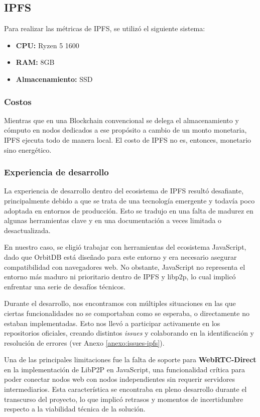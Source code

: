 \subsection{IPFS}

Para realizar las métricas de IPFS, se utilizó el siguiente sistema:
\begin{itemize}
    \item \textbf{CPU:} Ryzen 5 1600
    \item \textbf{RAM:} 8GB
    \item \textbf{Almacenamiento:} SSD
\end{itemize}

\subsubsection{Costos}

Mientras que en una Blockchain convencional se delega el almacenamiento y cómputo en nodos dedicados a ese propósito a cambio de un monto monetaria, IPFS ejecuta todo de manera local. El costo de IPFS no es, entonces, monetario sino energético.

\subsubsection{Experiencia de desarrollo}

La experiencia de desarrollo dentro del ecosistema de IPFS resultó desafiante, principalmente debido a que se trata de una tecnología emergente y todavía poco adoptada en entornos de producción. Esto se tradujo en una falta de madurez en algunas herramientas clave y en una documentación a veces limitada o desactualizada.

En nuestro caso, se eligió trabajar con herramientas del ecosistema JavaScript, dado que OrbitDB está diseñado para este entorno y era necesario asegurar compatibilidad con navegadores web. No obstante, JavaScript no representa el entorno más maduro ni prioritario dentro de IPFS y libp2p, lo cual implicó enfrentar una serie de desafíos técnicos.

Durante el desarrollo, nos encontramos con múltiples situaciones en las que ciertas funcionalidades no se comportaban como se esperaba, o directamente no estaban implementadas. Esto nos llevó a participar activamente en los repositorios oficiales, creando distintos \textit{issues} y colaborando en la identificación y resolución de errores (ver Anexo \ref{anexo:issues-ipfs}).

Una de las principales limitaciones fue la falta de soporte para \textbf{WebRTC-Direct} en la implementación de LibP2P en JavaScript, una funcionalidad crítica para poder conectar nodos web con nodos independientes sin requerir servidores intermediarios. Esta característica se encontraba en pleno desarrollo durante el transcurso del proyecto, lo que implicó retrasos y momentos de incertidumbre respecto a la viabilidad técnica de la solución.

